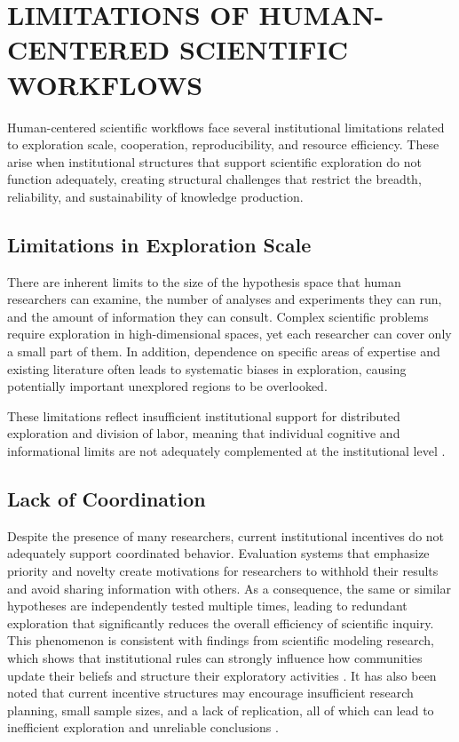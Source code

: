 \documentclass[sigconf]{aamas}
\begin{document}
\section{LIMITATIONS OF HUMAN-CENTERED SCIENTIFIC WORKFLOWS}

Human-centered scientific workflows face several institutional limitations related to exploration scale, cooperation, reproducibility, and resource efficiency. These arise when institutional structures that support scientific exploration do not function adequately, creating structural challenges that restrict the breadth, reliability, and sustainability of knowledge production.

\subsection{Limitations in Exploration Scale}

There are inherent limits to the size of the hypothesis space that human researchers can examine, the number of analyses and experiments they can run, and the amount of information they can consult. Complex scientific problems require exploration in high-dimensional spaces, yet each researcher can cover only a small part of them. In addition, dependence on specific areas of expertise and existing literature often leads to systematic biases in exploration, causing potentially important unexplored regions to be overlooked.

These limitations reflect insufficient institutional support for distributed exploration and division of labor, meaning that individual cognitive and informational limits are not adequately complemented at the institutional level \cite{oconnor2023modelling}.

\subsection{Lack of Coordination}

Despite the presence of many researchers, current institutional incentives do not adequately support coordinated behavior. Evaluation systems that emphasize priority and novelty create motivations for researchers to withhold their results and avoid sharing information with others. As a consequence, the same or similar hypotheses are independently tested multiple times, leading to redundant exploration that significantly reduces the overall efficiency of scientific inquiry. This phenomenon is consistent with findings from scientific modeling research, which shows that institutional rules can strongly influence how communities update their beliefs and structure their exploratory activities \cite{oconnor2023modelling}. It has also been noted that current incentive structures may encourage insufficient research planning, small sample sizes, and a lack of replication, all of which can lead to inefficient exploration and unreliable conclusions \cite{higginson2016incentives}.
\end{document}
